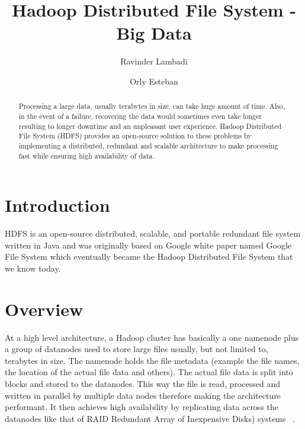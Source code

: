 
\title{Hadoop Distributed File System - Big Data}

\author{Ravinder Lambadi}


\author{Orly Esteban}

\begin{abstract}
Processing a large data, usually terabytes in size, can take huge
amount of time. Also, in the event of a failure, recovering the
data would sometimes even take longer resulting to longer 
downtime and an unpleasant user experience. Hadoop Distributed
File System (HDFS) provides an open-source solution to these problems
by implementing a distributed, redundant and scalable architecture
to make processing fast while ensuring high availability of data.

\end{abstract}


\maketitle

\section{Introduction}

HDFS is an open-source distributed, scalable, and portable redundant
file system written in Java and was originally based on Google white
paper named Google File System which eventually became the Hadoop
Distributed File System that we know today. 
 
\section{Overview}
 
At a high level architecture, a Hadoop cluster has basically a one
namenode plus a group of datanodes used to store large files usually,
but not limited to, terabytes in size. The namenode holds the file
metadata (example the file names, the location of the actual file
data and others). The actual file data is split into blocks and
stored to the datanodes. This way the file is read, processed and
written in parallel by multiple data nodes therefore making the 
architecture performant. It then achieves high availability by
replicating data across the datanodes like that of RAID
Redundant Array of Inexpensive Disks) systems ~\cite{hid-sp18-506-hdfs}.

